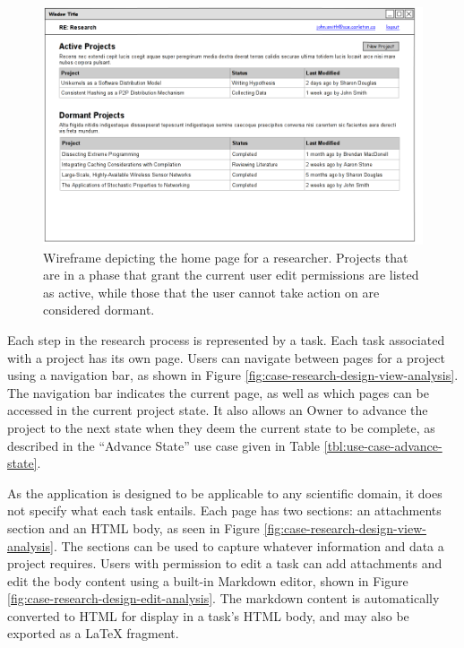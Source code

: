 \documentclass[document.tex]{subfiles}
\begin{document}
\begin{figure}[!ht]
\centering \includegraphics[width=5.5in]{./img/case-study-research-railgun/mockup-home-page}
\caption{Wireframe depicting the home page for a researcher. Projects that are in a phase that grant the current user edit permissions are listed as active, while those that the user cannot take action on are considered dormant.}
\label{fig:case-research-design-home-page}
\end{figure}

Each step in the research process is represented by a task. Each task associated with a project has its own page. Users can navigate between pages for a project using a navigation bar, as shown in Figure \ref{fig:case-research-design-view-analysis}. The navigation bar indicates the current page, as well as which pages can be accessed in the current project state. It also allows an Owner to advance the project to the next state when they deem the current state to be complete, as described in the ``Advance State'' use case given in Table \ref{tbl:use-case-advance-state}.

As the application is designed to be applicable to any scientific domain, it does not specify what each task entails.
Each page has two sections: an attachments section and an HTML body, as seen in Figure \ref{fig:case-research-design-view-analysis}.
The sections can be used to capture whatever information and data a project requires.
Users with permission to edit a task can add attachments and edit the body content using a built-in Markdown editor, shown in Figure \ref{fig:case-research-design-edit-analysis}.
The markdown content is automatically converted to HTML for display in a task's HTML body, and may also be exported as a LaTeX fragment.
\end{document}
